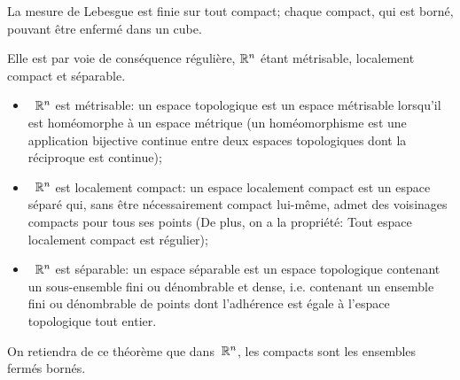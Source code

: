 \begin{theoreme}
La mesure de Lebesgue est finie sur tout compact; chaque compact, qui est borné, pouvant être enfermé dans un cube.
\end{theoreme}

Elle est par voie de conséquence régulière, $\mathbb R^n$ étant métrisable, localement compact et séparable.
\begin{itemize}
  \item~$\mathbb R^n$ est métrisable: un espace topologique est un espace métrisable lorsqu'il est homéomorphe à un espace métrique (un homéomorphisme est une application bijective  continue entre deux espaces topologiques dont la réciproque est continue);
  \item~$\mathbb R^n$ est localement compact: un espace localement compact est un espace séparé qui, sans être nécessairement compact lui-même, admet des voisinages compacts pour tous 	ses points (De plus, on a la propriété: Tout espace localement compact est régulier);
  \item~$\mathbb R^n$ est séparable: un espace séparable est un espace topologique contenant un 	sous-ensemble fini ou dénombrable et dense, i.e. contenant un ensemble fini ou dénombrable de points dont l'adhérence est égale à l'espace topologique tout entier.
\end{itemize}

\medskipvm
\begin{theoreme}\label{Th-BL}
On retiendra de ce théorème que dans~$\mathbb R^n$, les compacts sont les ensembles fermés bornés.
\end{theoreme}

